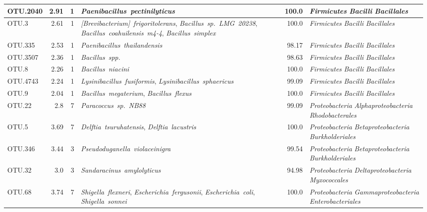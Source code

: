 \begin{longtable}{lrrP{5cm}rP{5cm}}
OTU.2040 & 2.91 & 1 & \mbox{\textit{Paenibacillus pectinilyticus}} & 100.0 & \mbox{\textit{Firmicutes}} \mbox{\textit{Bacilli}} \mbox{\textit{Bacillales}} \\ \midrule
OTU.3 & 2.61 & 1 & \mbox{\textit{[Brevibacterium] frigoritolerans}}, \mbox{\textit{Bacillus sp. LMG 20238}}, \mbox{\textit{Bacillus coahuilensis m4-4}}, \mbox{\textit{Bacillus simplex}} & 100.0 & \mbox{\textit{Firmicutes}} \mbox{\textit{Bacilli}} \mbox{\textit{Bacillales}} \\ \midrule
OTU.335 & 2.53 & 1 & \mbox{\textit{Paenibacillus thailandensis}} & 98.17 & \mbox{\textit{Firmicutes}} \mbox{\textit{Bacilli}} \mbox{\textit{Bacillales}} \\ \midrule
OTU.3507 & 2.36 & 1 & \mbox{\textit{Bacillus spp.}} & 98.63 & \mbox{\textit{Firmicutes}} \mbox{\textit{Bacilli}} \mbox{\textit{Bacillales}} \\ \midrule
OTU.8 & 2.26 & 1 & \mbox{\textit{Bacillus niacini}} & 100.0 & \mbox{\textit{Firmicutes}} \mbox{\textit{Bacilli}} \mbox{\textit{Bacillales}} \\ \midrule
OTU.4743 & 2.24 & 1 & \mbox{\textit{Lysinibacillus fusiformis}}, \mbox{\textit{Lysinibacillus sphaericus}} & 99.09 & \mbox{\textit{Firmicutes}} \mbox{\textit{Bacilli}} \mbox{\textit{Bacillales}} \\ \midrule
OTU.9 & 2.04 & 1 & \mbox{\textit{Bacillus megaterium}}, \mbox{\textit{Bacillus flexus}} & 100.0 & \mbox{\textit{Firmicutes}} \mbox{\textit{Bacilli}} \mbox{\textit{Bacillales}} \\ \midrule
OTU.22 & 2.8 & 7 & \mbox{\textit{Paracoccus sp. NB88}} & 99.09 & \mbox{\textit{Proteobacteria}} \mbox{\textit{Alphaproteobacteria}} \mbox{\textit{Rhodobacterales}} \\ \midrule
OTU.5 & 3.69 & 7 & \mbox{\textit{Delftia tsuruhatensis}}, \mbox{\textit{Delftia lacustris}} & 100.0 & \mbox{\textit{Proteobacteria}} \mbox{\textit{Betaproteobacteria}} \mbox{\textit{Burkholderiales}} \\ \midrule
OTU.346 & 3.44 & 3 & \mbox{\textit{Pseudoduganella violaceinigra}} & 99.54 & \mbox{\textit{Proteobacteria}} \mbox{\textit{Betaproteobacteria}} \mbox{\textit{Burkholderiales}} \\ \midrule
OTU.32 & 3.0 & 3 & \mbox{\textit{Sandaracinus amylolyticus}} & 94.98 & \mbox{\textit{Proteobacteria}} \mbox{\textit{Deltaproteobacteria}} \mbox{\textit{Myxococcales}} \\ \midrule
OTU.68 & 3.74 & 7 & \mbox{\textit{Shigella flexneri}}, \mbox{\textit{Escherichia fergusonii}}, \mbox{\textit{Escherichia coli}}, \mbox{\textit{Shigella sonnei}} & 100.0 & \mbox{\textit{Proteobacteria}} \mbox{\textit{Gammaproteobacteria}} \mbox{\textit{Enterobacteriales}} \\ \midrule

\end{longtable}
